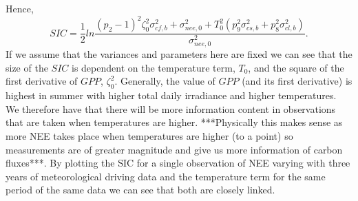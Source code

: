 \documentclass[11pt]{article}
\begin{document}
Hence,
\[
SIC = \frac{1}{2}ln\frac{(p_{2}-1)^{2}\zeta_0^{2}\sigma_{cf,b}^{2}+\sigma_{nee,0}^{2}+T_{0}^2(p_{9}^2\sigma_{cs,b}^2+p_8^2\sigma_{cl,b}^2)}{\sigma_{nee,0}^{2}}.
\]
If we assume that the variances and parameters here are fixed we can see that the size of the $SIC$ is dependent on the temperature term, $T_0$, and the square of the first derivative of $GPP$, $\zeta_0^{2}$. Generally, the value of $GPP$ (and its first derivative) is highest in summer with higher total daily irradiance and higher temperatures. We therefore have that there will be more information content in observations that are taken when temperatures are higher. ***Physically this makes sense as more NEE takes place when temperatures are higher (to a point) so measurements are of greater magnitude and give us more information of carbon fluxes***. By plotting the SIC for a single observation of NEE varying with three years of meteorological driving data and the temperature term for the same period of the same data we can see that both are closely linked.
\end{document}
